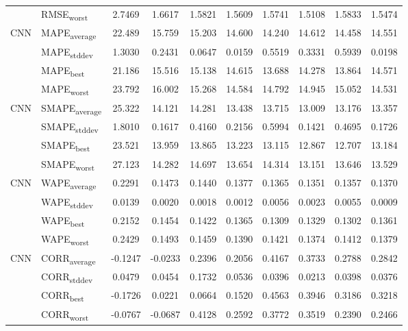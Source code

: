 {\begin{longtable}{l l c c c c c c c c}
 & RMSE\textsubscript{worst} & 2.7469 & 1.6617 & 1.5821 & 1.5609 & 1.5741 & 1.5108 & 1.5833 & 1.5474 \\
\cmidrule(lr){2-10}
\multirow{4}{*}{CNN} & MAPE\textsubscript{average} & 22.489 & 15.759 & 15.203 & 14.600 & 14.240 & 14.612 & 14.458 & 14.551 \\
 & MAPE\textsubscript{stddev} & 1.3030 & 0.2431 & 0.0647 & 0.0159 & 0.5519 & 0.3331 & 0.5939 & 0.0198 \\
 & MAPE\textsubscript{best} & 21.186 & 15.516 & 15.138 & 14.615 & 13.688 & 14.278 & 13.864 & 14.571 \\
 & MAPE\textsubscript{worst} & 23.792 & 16.002 & 15.268 & 14.584 & 14.792 & 14.945 & 15.052 & 14.531 \\
\cmidrule(lr){2-10}
\multirow{4}{*}{CNN} & SMAPE\textsubscript{average} & 25.322 & 14.121 & 14.281 & 13.438 & 13.715 & 13.009 & 13.176 & 13.357 \\
 & SMAPE\textsubscript{stddev} & 1.8010 & 0.1617 & 0.4160 & 0.2156 & 0.5994 & 0.1421 & 0.4695 & 0.1726 \\
 & SMAPE\textsubscript{best} & 23.521 & 13.959 & 13.865 & 13.223 & 13.115 & 12.867 & 12.707 & 13.184 \\
 & SMAPE\textsubscript{worst} & 27.123 & 14.282 & 14.697 & 13.654 & 14.314 & 13.151 & 13.646 & 13.529 \\
\cmidrule(lr){2-10}
\multirow{4}{*}{CNN} & WAPE\textsubscript{average} & 0.2291 & 0.1473 & 0.1440 & 0.1377 & 0.1365 & 0.1351 & 0.1357 & 0.1370 \\
 & WAPE\textsubscript{stddev} & 0.0139 & 0.0020 & 0.0018 & 0.0012 & 0.0056 & 0.0023 & 0.0055 & 0.0009 \\
 & WAPE\textsubscript{best} & 0.2152 & 0.1454 & 0.1422 & 0.1365 & 0.1309 & 0.1329 & 0.1302 & 0.1361 \\
 & WAPE\textsubscript{worst} & 0.2429 & 0.1493 & 0.1459 & 0.1390 & 0.1421 & 0.1374 & 0.1412 & 0.1379 \\
\cmidrule(lr){2-10}
\multirow{4}{*}{CNN} & CORR\textsubscript{average} & -0.1247 & -0.0233 & 0.2396 & 0.2056 & 0.4167 & 0.3733 & 0.2788 & 0.2842 \\
 & CORR\textsubscript{stddev} & 0.0479 & 0.0454 & 0.1732 & 0.0536 & 0.0396 & 0.0213 & 0.0398 & 0.0376 \\
 & CORR\textsubscript{best} & -0.1726 & 0.0221 & 0.0664 & 0.1520 & 0.4563 & 0.3946 & 0.3186 & 0.3218 \\
 & CORR\textsubscript{worst} & -0.0767 & -0.0687 & 0.4128 & 0.2592 & 0.3772 & 0.3519 & 0.2390 & 0.2466 \\

\end{longtable}}
